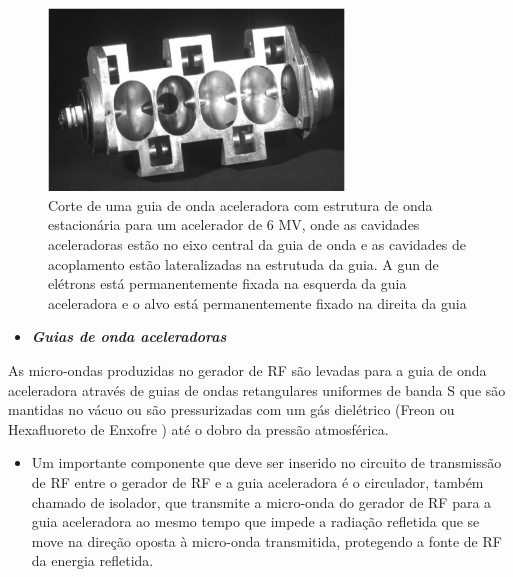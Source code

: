 \documentclass[11pt,a4paper]{article}
\begin{document}
                    \begin{figure}[h]
                        \centering
                        \includegraphics[width=0.7\textwidth]{Imagens/corteGuiaDeOndaEstacionaria.jpg}
                        \caption{Corte de uma guia de onda aceleradora com estrutura de onda estacionária para um acelerador de 6 MV, onde as cavidades aceleradoras estão no eixo central da guia de onda e as cavidades de acoplamento estão lateralizadas na estrutuda da guia. A gun de elétrons está permanentemente fixada na esquerda da guia aceleradora e o alvo está permanentemente fixado na direita da guia}
                        \label{fig:corteGuiaDeOndaEstacionaria}
                    \end{figure}


                \begin{itemize}
                    \item \textbf{\textit{\textcolor{CarnationPink}{Guias de onda aceleradoras}}}
                \end{itemize}


                    As micro-ondas produzidas no gerador de RF são levadas para a guia de onda aceleradora através de guias de ondas retangulares uniformes de banda S que são mantidas no vácuo ou são pressurizadas com um gás dielétrico (Freon ou Hexafluoreto de Enxofre ) até o dobro da pressão atmosférica.

                    \begin{itemize}
                        \item Um importante componente que deve ser inserido no circuito de transmissão de RF entre o gerador de RF e a guia aceleradora é o circulador, também chamado de isolador, que transmite a micro-onda do gerador de RF para a guia aceleradora ao mesmo tempo que impede a radiação refletida que se move na direção oposta à micro-onda transmitida, protegendo a fonte de RF da energia refletida.
                    \end{itemize}
\end{document}
